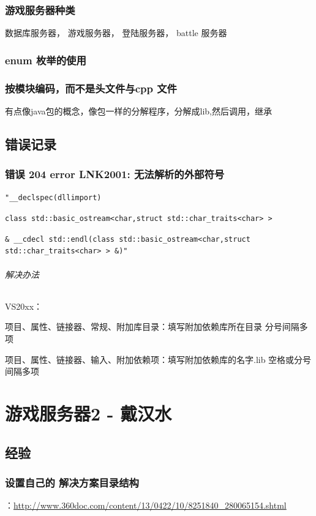 \documentclass[UTF8,a4paper,8pt]{ctexbook}
\begin{document}
		 \subsection{游戏服务器种类}
		 数据库服务器， 游戏服务器， 登陆服务器， battle 服务器
		 
		 \subsection{enum 枚举的使用}
		 
		 \subsection{按模块编码，而不是头文件与cpp 文件}有点像java包的概念，像包一样的分解程序，分解成lib,然后调用，继承
		 
\newpage
	\section{错误记录}
		\subsection{错误	204	error LNK2001: 无法解析的外部符号} 
		\verb|"__declspec(dllimport)| 
		
		\verb|class std::basic_ostream<char,struct std::char_traits<char> >| 
		
		\verb|& __cdecl std::endl(class std::basic_ostream<char,struct std::char_traits<char> > &)"| 
		
		\subparagraph{解决办法}
		VS20xx：
		
		项目、属性、链接器、常规、附加库目录：填写附加依赖库所在目录 分号间隔多项
		
		项目、属性、链接器、输入、附加依赖项：填写附加依赖库的名字.lib 空格或分号间隔多项



\chapter{游戏服务器2 - 戴汉水}
	\section{经验}
	
		\subsection{设置自己的 解决方案目录结构}：\url{http://www.360doc.com/content/13/0422/10/8251840_280065154.shtml}
	
\end{document}
